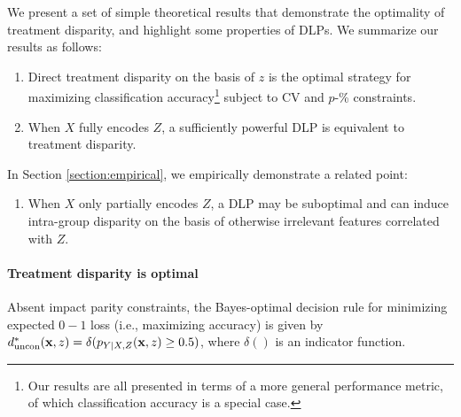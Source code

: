 We present a set of simple theoretical results 
that demonstrate the optimality of treatment disparity, 
and highlight some properties of DLPs.  
We summarize our results as follows:
\begin{enumerate}
\item Direct treatment disparity on the basis of $z$ 
is the optimal strategy 
for maximizing classification accuracy\footnote{Our results are all presented in terms of a more general performance metric, of which classification accuracy is a special case.}
subject to CV and $p$-\% constraints.  
\item When $X$ fully encodes $Z$, a sufficiently powerful DLP is equivalent to treatment disparity.
\end{enumerate}
In Section \ref{section:empirical}, 
we empirically demonstrate a related point:
\begin{enumerate}[resume]
 \item When $X$ only partially encodes $Z$,
a DLP may be suboptimal and can induce intra-group disparity
on the basis of otherwise irrelevant features correlated with $Z$.
\end{enumerate}


\paragraph{Treatment disparity is optimal}
Absent impact parity constraints, the Bayes-optimal decision rule for minimizing expected $0-1$ loss (i.e., maximizing accuracy) is given by 
%
$d_{\mathrm{uncon}}^*(\mathbf x,z) = \delta( p_{Y|X, Z}(\mathbf x,z) \ge 0.5)$, where $\delta()$ is an indicator function.
% 


